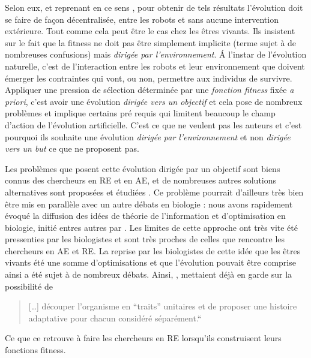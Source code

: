 Selon eux, et reprenant en ce sens \cite{watson02embodiedevolutiondistributingevolutionaryalgorithmpopulationrobots}, pour obtenir de tels résultats l'évolution doit se faire de façon décentralisée, entre les robots et sans aucune intervention extérieure. Tout comme cela peut être le cas chez les êtres vivants. Ils insistent sur le fait que la fitness ne doit pas être simplement implicite (terme sujet à de nombreuses confusions) mais \emph{dirigée par l'environnement}. \'A l'instar de l'évolution naturelle, c'est de l'interaction entre les robots et leur environnement que doivent émerger les contraintes qui vont, ou non, permettre aux individus de survivre. Appliquer une pression de sélection déterminée par une \emph{fonction fitness} fixée \emph{a priori}, c'est avoir une évolution \emph{dirigée vers un objectif} et cela pose de nombreux problèmes et implique certains pré requis qui limitent beaucoup le champ d'action de l'évolution artificielle. C'est ce que ne veulent pas les auteurs et c'est pourquoi ils souhaite une évolution \emph{dirigée par l'environnement} et non \emph{dirigée vers un but} ce que \cite{watson02embodiedevolutiondistributingevolutionaryalgorithmpopulationrobots} ne proposent pas.

Les problèmes que posent cette évolution dirigée par un objectif sont biens connus des chercheurs en RE et en AE, et de nombreuses autres solutions alternatives sont proposées et étudiées \citep{lehman10efficientlyevolvingprogramsthroughsearchnovelty,lehman2011abandoningobjectivesevolutionthroughthesearchfornoveltyalone,risi2009hownoveltysearchescapesthedeceptivetrapoflearningtolearn,mouret2012encouragingbehavioraldiversityinevolutionaryrobotics}. Ce problème pourrait d'ailleurs très bien être mis en parallèle avec un autre débats en biologie : nous avons rapidement évoqué la diffusion des idées de théorie de l'information et d'optimisation en biologie, initié entres autres par \cite{maynardsmith78optimizationtheoryinevolution}. Les limites de cette approche ont très vite été pressenties par les biologistes et sont très proches de celles que rencontre les chercheurs en AE et RE. La reprise par les biologistes de cette idée que les êtres vivants été une somme d'optimisations et que l'évolution pouvait être comprise ainsi a été sujet à de nombreux débats.
Ainsi, \cite{gould1979spandrelssanmarcopanglossianparadigmcritiqueadaptationistprogramme}, mettaient déjà en garde sur la possibilité de

\begin{quote}
   [\ldots] découper l'organisme en ``traits'' unitaires et de proposer une histoire adaptative pour chacun considéré séparément.``
\end{quote}
Ce que ce retrouve à faire les chercheurs en RE lorsqu'ils construisent leurs fonctions fitness.

